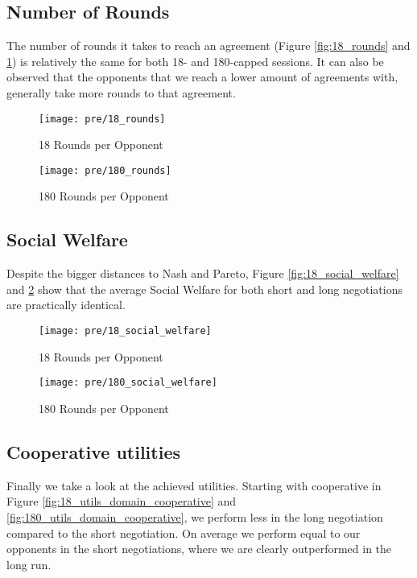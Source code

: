 \subsection{Number of Rounds}

The number of rounds it takes to reach an agreement (Figure \ref{fig:18_rounds} and \ref{fig:180_rounds}) is relatively the same for both 18- and 180-capped sessions. It can also be observed that the opponents that we reach a lower amount of agreements with, generally take more rounds to that agreement.\\

\begin{figure}[H]
	\texttt{[image: pre/18\_rounds]}
	\caption{18 Rounds per Opponent}
	\label{fig:18_rounds}
	\endminipage\hfill
	\texttt{[image: pre/180\_rounds]}
	\caption{180 Rounds per Opponent}
	\label{fig:180_rounds}
	\endminipage\hfill
\end{figure}

\subsection{Social Welfare}

Despite the bigger distances to Nash and Pareto, Figure \ref{fig:18_social_welfare} and \ref{fig:180_social_welfare} show that the average Social Welfare for both short and long negotiations are practically identical. \\

\begin{figure}[H]
	\texttt{[image: pre/18\_social\_welfare]}
	\caption{18 Rounds per Opponent}
	\label{fig:18_social_welfare}
	\endminipage\hfill
	\texttt{[image: pre/180\_social\_welfare]}
	\caption{180 Rounds per Opponent}
	\label{fig:180_social_welfare}
	\endminipage\hfill
\end{figure}

\subsection{Cooperative utilities}

Finally we take a look at the achieved utilities. Starting with cooperative in Figure \ref{fig:18_utils_domain_cooperative} and \ref{fig:180_utils_domain_cooperative}, we perform less in the long negotiation compared to the short negotiation. On average we perform equal to our opponents in the short negotiations, where we are clearly outperformed in the long run.\\

